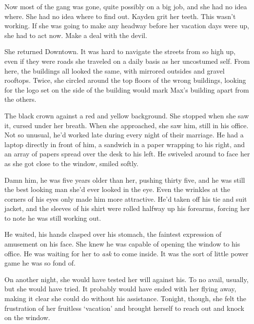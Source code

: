 Now most of the gang was gone, quite possibly on a big job, and she had no idea where.  She had no idea where to find out.  Kayden grit her teeth.  This wasn't working.  If she was going to make any headway before her vacation days were up, she had to act now.  Make a deal with the devil.



She returned Downtown.  It was hard to navigate the streets from so high up, even if they were roads she traveled on a daily basis as her uncostumed self.  From here, the buildings all looked the same, with mirrored outsides and gravel rooftops.  Twice, she circled around the top floors of the wrong buildings, looking for the logo set on the side of the building would mark Max's building apart from the others.



The black crown against a red and yellow background.  She stopped when she saw it, cursed under her breath.  When she approached, she saw him, still in his office.  Not so unusual, he'd worked late during every night of their marriage.  He had a laptop directly in front of him, a sandwich in a paper wrapping to his right, and an array of papers spread over the desk to his left.  He swiveled around to face her as she got close to the window, smiled softly.



Damn him, he was five years older than her, pushing thirty five, and he was still the best looking man she'd ever looked in the eye.  Even the wrinkles at the corners of his eyes only made him more attractive.  He'd taken off his tie and suit jacket, and the sleeves of his shirt were rolled halfway up his forearms, forcing her to note he was still working out.



He waited, his hands clasped over his stomach, the faintest expression of amusement on his face.  She knew he was capable of opening the window to his office.  He was waiting for her to \emph{ask} to come inside.  It was the sort of little power game he was so fond of.



On another night, she would have tested her will against his.  To no avail, usually, but she would have tried.  It probably would have ended with her flying away, making it clear she could do without his assistance.  Tonight, though, she felt the frustration of her fruitless `vacation' and brought herself to reach out and knock on the window.



